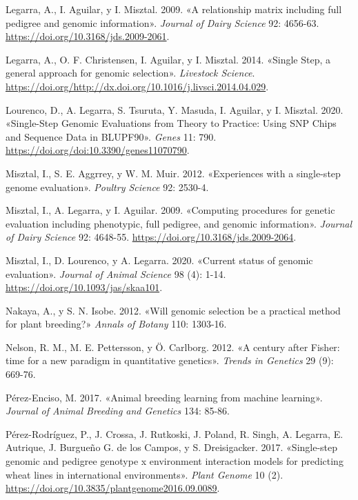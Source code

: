 \documentclass[11pt,spanish,a4paper,oneside,]{book} %
\begin{document}
\leavevmode\hypertarget{ref-cite:17}{}%
Legarra, A., I. Aguilar, y I. Misztal. 2009. «A relationship matrix including full pedigree and genomic information». \emph{Journal of Dairy Science} 92: 4656-63. \url{https://doi.org/10.3168/jds.2009-2061}.

\leavevmode\hypertarget{ref-cite:15}{}%
Legarra, A., O. F. Christensen, I. Aguilar, y I. Misztal. 2014. «Single Step, a general approach for genomic selection». \emph{Livestock Science}. \url{https://doi.org/http://dx.doi.org/10.1016/j.livsci.2014.04.029}.

\leavevmode\hypertarget{ref-cite:22}{}%
Lourenco, D., A. Legarra, S. Tsuruta, Y. Masuda, I. Aguilar, y I. Misztal. 2020. «Single-Step Genomic Evaluations from Theory to Practice: Using SNP Chips and Sequence Data in BLUPF90». \emph{Genes} 11: 790. \url{https://doi.org/doi:10.3390/genes11070790}.

\leavevmode\hypertarget{ref-cite:14}{}%
Misztal, I., S. E. Aggrrey, y W. M. Muir. 2012. «Experiences with a single-step genome evaluation». \emph{Poultry Science} 92: 2530-4.

\leavevmode\hypertarget{ref-cite:16}{}%
Misztal, I., A. Legarra, y I. Aguilar. 2009. «Computing procedures for genetic evaluation including phenotypic, full pedigree, and genomic information». \emph{Journal of Dairy Science} 92: 4648-55. \url{https://doi.org/10.3168/jds.2009-2064}.

\leavevmode\hypertarget{ref-cite:18}{}%
Misztal, I., D. Lourenco, y A. Legarra. 2020. «Current status of genomic evaluation». \emph{Journal of Animal Science} 98 (4): 1-14. \url{https://doi.org/10.1093/jas/skaa101}.

\leavevmode\hypertarget{ref-cite:6}{}%
Nakaya, A., y S. N. Isobe. 2012. «Will genomic selection be a practical method for plant breeding?» \emph{Annals of Botany} 110: 1303-16.

\leavevmode\hypertarget{ref-cite:2}{}%
Nelson, R. M., M. E. Pettersson, y Ö. Carlborg. 2012. «A century after Fisher: time for a new paradigm in quantitative genetics». \emph{Trends in Genetics} 29 (9): 669-76.

\leavevmode\hypertarget{ref-cite:5}{}%
Pérez-Enciso, M. 2017. «Animal breeding learning from machine learning». \emph{Journal of Animal Breeding and Genetics} 134: 85-86.

\leavevmode\hypertarget{ref-cite:19}{}%
Pérez-Rodríguez, P., J. Crossa, J. Rutkoski, J. Poland, R. Singh, A. Legarra, E. Autrique, J. Burgueño G. de los Campos, y S. Dreisigacker. 2017. «Single-step genomic and pedigree genotype x environment interaction models for predicting wheat lines in international environments». \emph{Plant Genome} 10 (2). \url{https://doi.org/10.3835/plantgenome2016.09.0089}.
\end{document}

